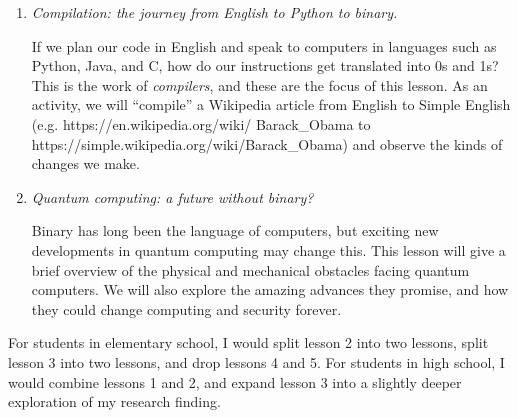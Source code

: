 \begin{enumerate}
  \item \emph{Compilation: the journey from English to Python to binary.}

  If we plan our code in English and speak to computers in languages such as Python, Java, and C, how do our instructions get translated into 0s and 1s?
  This is the work of \emph{compilers}, and these are the focus of this lesson.
  As an activity, we will ``compile'' a Wikipedia article from English to Simple English (e.g. https://en.wikipedia.org/wiki/ Barack\_Obama to https://simple.wikipedia.org/wiki/Barack\_Obama) and observe the kinds of changes we make.

  \item \emph{Quantum computing: a future without binary?}

  Binary has long been the language of computers, but exciting new developments in quantum computing may change this.
  This lesson will give a brief overview of the physical and mechanical obstacles facing quantum computers.
  We will also explore the amazing advances they promise, and how they could change computing and security forever.

\end{enumerate}

For students in elementary school, I would split lesson 2 into two lessons, split lesson 3 into two lessons, and drop lessons 4 and 5.
For students in high school, I would combine lessons 1 and 2, and expand lesson 3 into a slightly deeper exploration of my research finding.